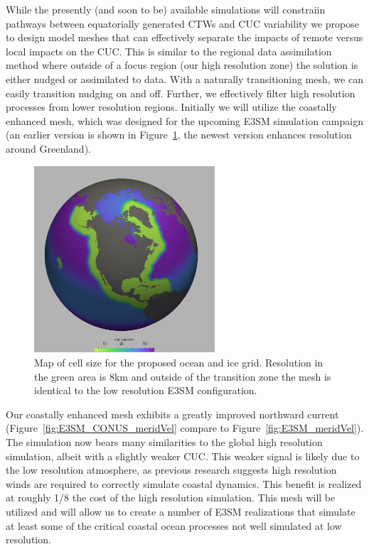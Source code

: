 While the presently (and soon to be) available simulations will constraiin pathways between equatorially generated CTWs and CUC variability we propose to design model meshes that can effectively separate  the impacts of remote versus local impacts on the CUC.  This is similar to the regional data assimilation method \citep{lu2016understanding,lu2017understanding} where outside of a focus region (our high resolution zone) the solution is either nudged or assimilated to data.  With a naturally transitioning mesh, we can easily transition nudging on and off.  Further, we effectively filter high resolution processes from lower resolution regions.  Initially we will utilize the coastally enhanced mesh, which was designed for the upcoming E3SM simulation campaign (an earlier version is shown in Figure~\ref{fig:coastalMesh}, the newest version enhances resolution around Greenland).

\begin{figure}[h]
  \centering
  \includegraphics[width=0.6\textwidth]{cellSize.png}
  \caption{Map of cell size for the proposed ocean and ice grid.  Resolution in the green area is 8km and outside of the transition zone the mesh is identical to the low resolution E3SM configuration.}
  \label{fig:coastalMesh}
\end{figure}

Our coastally enhanced mesh exhibits a greatly improved northward current (Figure~\ref{fig:E3SM_CONUS_meridVel} compare to Figure~\ref{fig:E3SM_meridVel}).  The simulation now bears many similarities to the global high resolution simulation, albeit with a slightly weaker CUC.  This weaker signal is likely due to the low resolution atmosphere, as previous research \citep{capet2004upwelling,small2014new} suggests high resolution winds are required to correctly simulate coastal dynamics.  This benefit is realized at roughly 1/8 the cost of the high resolution simulation.  This mesh will be utilized and will allow us to create a number of E3SM realizations that simulate at least some of the critical coastal ocean processes not well simulated at low resolution.

